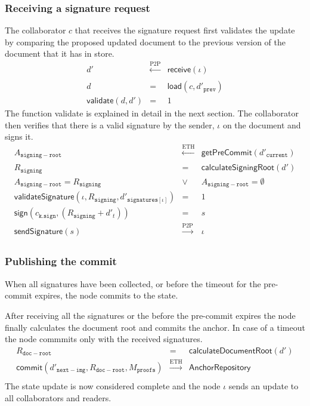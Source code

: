 \subsubsection{Receiving a signature request}
The collaborator $c$ that receives the signature request first validates the update by comparing the proposed updated document to the previous version of the document that it has in store. 
\begin{eqnarray}
   d' & \xleftarrow[]{\text{P2P}} & \mathsf{receive}(\iota) \\
    d & = &\mathsf{load}(c, {d'}_{\mathtt{prev}}) \\
    \mathsf{validate}(d, d') & = & 1 
\end{eqnarray}
The function \textsf{validate} is explained in detail in the next section.
The collaborator then verifies that there is a valid signature by the sender, $\iota$ on the document and signs it.\\
\begin{eqnarray}
    A_{\mathtt{signing-root}} & \xleftarrow[]{\text{ETH}} & \mathsf{getPreCommit}(d'_{\mathtt{current}}) \\
    R_{\mathtt{signing}} & = & \mathsf{calculateSigningRoot}(d')\\
    A_{\mathtt{signing-root}} = R_{\mathtt{signing}} &\lor & A_{\mathtt{signing-root}} = \emptyset \\
    \mathsf{validateSignature}(\iota, R_{\mathtt{signing}}, {d'}_{\mathtt{signatures}[\iota]}) & = & 1\\
    \mathsf{sign}(c_{\mathtt{k.sign}}, (R_{\mathtt{signing}}+d'_{t})) & = & s \\
    \mathsf{sendSignature}(s) &\xrightarrow[]{\text{P2P}}& \iota
\end{eqnarray}

\subsubsection{Publishing the commit}

When all signatures have been collected, or before the timeout for the pre-commit expires, the node commits to the state. 

After receiving all the signatures or the before the pre-commit expires the node finally calculates the document root and commits the anchor.  In case of a timeout the node commmits only with the received signatures.
\begin{eqnarray}
R_{\mathtt{doc-root}} & = & \mathsf{calculateDocumentRoot}(d')\\
  \mathsf{commit}(d'_{\mathtt{next-img}}, R_{\mathtt{doc-root}},M_{\texttt{proofs}}) &\xrightarrow[]{\text{ETH}}& \mathsf{AnchorRepository}\\ 
  \end{eqnarray}
The state update is now considered complete and the node $\iota$ sends an update to all collaborators and readers.


